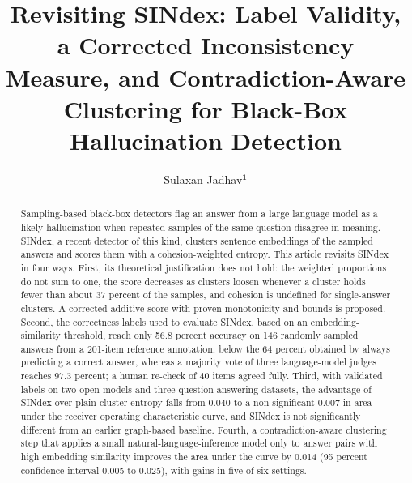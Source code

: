 \documentclass{ieeetj}
\def\authorrefmark#1{\ensuremath{^{\textbf{#1}}}}
\begin{document}


\title{Revisiting SINdex: Label Validity, a Corrected Inconsistency Measure, and Contradiction-Aware Clustering for Black-Box Hallucination Detection}

\author{Sulaxan Jadhav\authorrefmark{1}}

\begin{abstract}
Sampling-based black-box detectors flag an answer from a large language model as a likely hallucination when repeated samples of the same question disagree in meaning. SINdex, a recent detector of this kind, clusters sentence embeddings of the sampled answers and scores them with a cohesion-weighted entropy. This article revisits SINdex in four ways. First, its theoretical justification does not hold: the weighted proportions do not sum to one, the score decreases as clusters loosen whenever a cluster holds fewer than about 37 percent of the samples, and cohesion is undefined for single-answer clusters. A corrected additive score with proven monotonicity and bounds is proposed. Second, the correctness labels used to evaluate SINdex, based on an embedding-similarity threshold, reach only 56.8 percent accuracy on 146 randomly sampled answers from a 201-item reference annotation, below the 64 percent obtained by always predicting a correct answer, whereas a majority vote of three language-model judges reaches 97.3 percent; a human re-check of 40 items agreed fully. Third, with validated labels on two open models and three question-answering datasets, the advantage of SINdex over plain cluster entropy falls from 0.040 to a non-significant 0.007 in area under the receiver operating characteristic curve, and SINdex is not significantly different from an earlier graph-based baseline. Fourth, a contradiction-aware clustering step that applies a small natural-language-inference model only to answer pairs with high embedding similarity improves the area under the curve by 0.014 (95 percent confidence interval 0.005 to 0.025), with gains in five of six settings.
\end{abstract}
\end{document}
